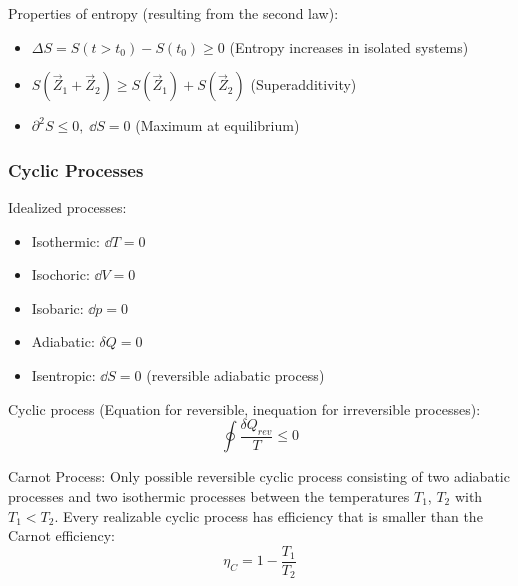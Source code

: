 			\noindent
			Properties of entropy (resulting from the second law):
			\begin{itemize}\itemsep -0pt	%
				\item $\Delta S = S(t>t_0)-S(t_0) \ge 0$ \hfill{(Entropy increases in isolated systems)}
				\item $S(\vec{Z}_1 + \vec{Z}_2) \ge S(\vec{Z}_1) + S(\vec{Z}_2)$ \hfill{(Superadditivity)}
				\item $\partial^2 S \le 0,\;\dd S = 0$ \hfill{(Maximum at equilibrium)}
			\end{itemize}

		\subsubsection{Cyclic Processes}
			\noindent
			Idealized processes:
			\begin{itemize}
				\item Isothermic: $\dd T = 0$
				\item Isochoric: $\dd V = 0$
				\item Isobaric: $\dd p = 0$
				\item Adiabatic: $\delta Q = 0$
				\item Isentropic: $\dd S = 0$ (reversible adiabatic process)
			\end{itemize}

			\noindent
			Cyclic process (Equation for reversible, inequation for irreversible processes):
			\begin{equation}
				\oint \frac{\delta Q_{rev}}{T} \le 0
			\end{equation}

			\noindent
			Carnot Process:
			Only possible reversible cyclic process consisting of two adiabatic processes and two isothermic processes between the temperatures $T_1$, $T_2$ with $T_1 < T_2$. Every realizable cyclic process has efficiency that is smaller than the Carnot efficiency:
			\begin{equation}
				\eta_C = 1-\frac{T_1}{T_2}
			\end{equation}

